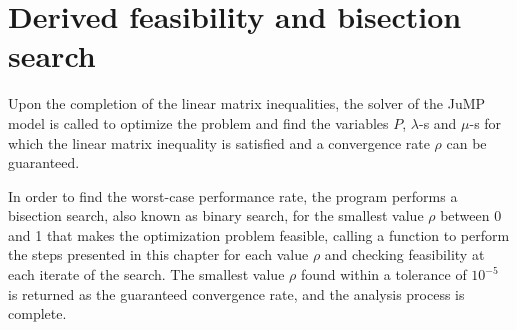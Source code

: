 
\section{Derived feasibility and bisection search}
Upon the completion of the linear matrix inequalities, the solver of the JuMP model is called to optimize the problem and find the variables \texttt{$P$}, \texttt{$\lambda$}-s and \texttt{$\mu$}-s for which the linear matrix inequality is satisfied and a convergence rate $\rho$ can be guaranteed.

In order to find the worst-case performance rate, the program performs a bisection search, also known as binary search, for the smallest value $\rho$ between 0 and 1 that makes the optimization problem feasible, calling a function to perform the steps presented in this chapter for each value \texttt{$\rho$} and checking feasibility at each iterate of the search. The smallest value \texttt{$\rho$} found within a tolerance of $10^{-5}$ is returned as the guaranteed convergence rate, and the analysis process is complete.